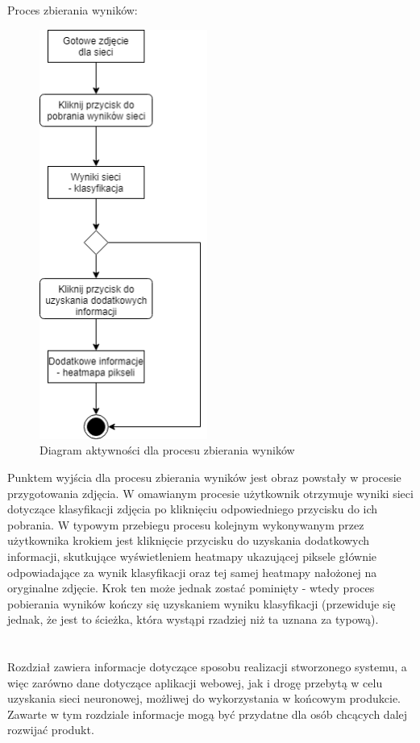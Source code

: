 \documentclass[polish,12pt]{aghthesis}
\begin{document}
\newpage

Proces zbierania wyników:

\begin{figure}[h]
    \centering
    \label{fig:predict-proccess}    \includegraphics[width=5.5cm]{images/proces_zbierania_wynikow.png}
    \caption{Diagram aktywności dla procesu zbierania wyników}
\end{figure}

\par Punktem wyjścia dla procesu zbierania wyników jest obraz powstały w procesie przygotowania zdjęcia. W omawianym procesie użytkownik otrzymuje wyniki sieci dotyczące klasyfikacji zdjęcia po kliknięciu odpowiedniego przycisku do ich pobrania. W typowym przebiegu procesu kolejnym wykonywanym przez użytkownika krokiem jest kliknięcie przycisku do uzyskania dodatkowych informacji, skutkujące wyświetleniem heatmapy ukazującej piksele głównie odpowiadające za wynik klasyfikacji oraz tej samej heatmapy nałożonej na oryginalne zdjęcie. Krok ten może jednak zostać pominięty - wtedy proces pobierania wyników kończy się uzyskaniem wyniku klasyfikacji (przewiduje się jednak, że jest to ścieżka, która wystąpi rzadziej niż ta uznana za typową).

\newpage
\section{\SectionTitleRealizationAspects}
\label{sec:wybrane-aspekty-realizacji}
\par Rozdział zawiera informacje dotyczące sposobu realizacji stworzonego systemu, a więc zarówno dane dotyczące aplikacji webowej, jak i drogę przebytą w celu uzyskania sieci neuronowej, możliwej do wykorzystania w końcowym produkcie. Zawarte w tym rozdziale informacje mogą być przydatne dla osób chcących dalej rozwijać produkt.
\end{document}
